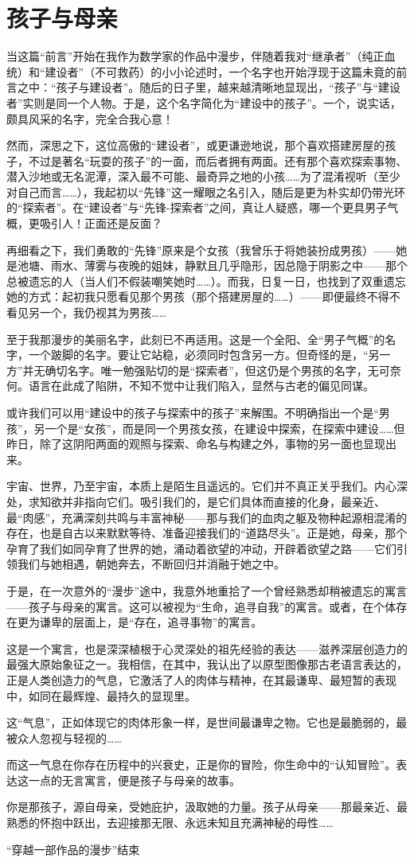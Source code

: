 
\section{孩子与母亲}

当这篇“前言”开始在我作为数学家的作品中漫步，伴随着我对“继承者”（纯正血统）和“建设者”（不可救药）的小小论述时，一个名字也开始浮现于这篇未竟的前言之中：“孩子与建设者”。随后的日子里，越来越清晰地显现出，“孩子”与“建设者”实则是同一个人物。于是，这个名字简化为“建设中的孩子”。一个，说实话，颇具风采的名字，完全合我心意！

然而，深思之下，这位高傲的“建设者”，或更谦逊地说，那个喜欢搭建房屋的孩子，不过是著名“玩耍的孩子”的一面，而后者拥有两面。还有那个喜欢探索事物、潜入沙地或无名泥潭，深入最不可能、最奇异之地的小孩……为了混淆视听（至少对自己而言……），我起初以“先锋”这一耀眼之名引入，随后是更为朴实却仍带光环的“探索者”。在“建设者”与“先锋-探索者”之间，真让人疑惑，哪一个更具男子气概，更吸引人！正面还是反面？

再细看之下，我们勇敢的“先锋”原来是个女孩（我曾乐于将她装扮成男孩）——她是池塘、雨水、薄雾与夜晚的姐妹，静默且几乎隐形，因总隐于阴影之中——那个总被遗忘的人（当人们不假装嘲笑她时……）。而我，日复一日，也找到了双重遗忘她的方式：起初我只愿看见那个男孩（那个搭建房屋的……）——即便最终不得不看见另一个，我仍视其为男孩……

至于我那漫步的美丽名字，此刻已不再适用。这是一个全阳、全“男子气概”的名字，一个跛脚的名字。要让它站稳，必须同时包含另一方。但奇怪的是，“另一方”并无确切名字。唯一勉强贴切的是“探索者”，但这仍是个男孩的名字，无可奈何。语言在此成了陷阱，不知不觉中让我们陷入，显然与古老的偏见同谋。

或许我们可以用“建设中的孩子与探索中的孩子”来解围。不明确指出一个是“男孩”，另一个是“女孩”，而是同一个男孩女孩，在建设中探索，在探索中建设……但昨日，除了这阴阳两面的观照与探索、命名与构建之外，事物的另一面也显现出来。

宇宙、世界，乃至宇宙，本质上是陌生且遥远的。它们并不真正关乎我们。内心深处，求知欲并非指向它们。吸引我们的，是它们具体而直接的化身，最亲近、最“肉感”，充满深刻共鸣与丰富神秘——那与我们的血肉之躯及物种起源相混淆的存在，也是自古以来默默等待、准备迎接我们的“道路尽头”。正是她，母亲，那个孕育了我们如同孕育了世界的她，涌动着欲望的冲动，开辟着欲望之路——它们引领我们与她相遇，朝她奔去，不断回归并消融于她之中。

于是，在一次意外的“漫步”途中，我意外地重拾了一个曾经熟悉却稍被遗忘的寓言——孩子与母亲的寓言。这可以被视为“生命，追寻自我”的寓言。或者，在个体存在更为谦卑的层面上，是“存在，追寻事物”的寓言。

这是一个寓言，也是深深植根于心灵深处的祖先经验的表达——滋养深层创造力的最强大原始象征之一。我相信，在其中，我认出了以原型图像那古老语言表达的，正是人类创造力的气息，它激活了人的肉体与精神，在其最谦卑、最短暂的表现中，如同在最辉煌、最持久的显现里。

这“气息”，正如体现它的肉体形象一样，是世间最谦卑之物。它也是最脆弱的，最被众人忽视与轻视的……

而这一气息在你存在历程中的兴衰史，正是你的冒险，你生命中的“认知冒险”。表达这一点的无言寓言，便是孩子与母亲的故事。

你是那孩子，源自母亲，受她庇护，汲取她的力量。孩子从母亲——那最亲近、最熟悉的怀抱中跃出，去迎接那无限、永远未知且充满神秘的母性……

\hfill “穿越一部作品的漫步”结束